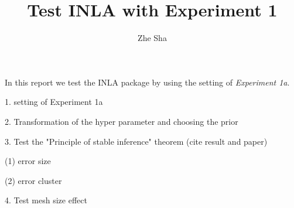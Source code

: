 \documentclass[a4paper,12pt]{article}
\begin{document}
\title{Test INLA with Experiment 1}
\author{Zhe Sha}
\maketitle

\onehalfspacing
{}
In this report we test the INLA package by using the setting of \emph{Experiment 1a}.


1. setting of Experiment 1a


2. Transformation of the hyper parameter and choosing the prior


3. Test the "Principle of stable inference" theorem (cite result and paper)

(1) error size

(2) error cluster


4. Test mesh size effect



















%
\end{document}
